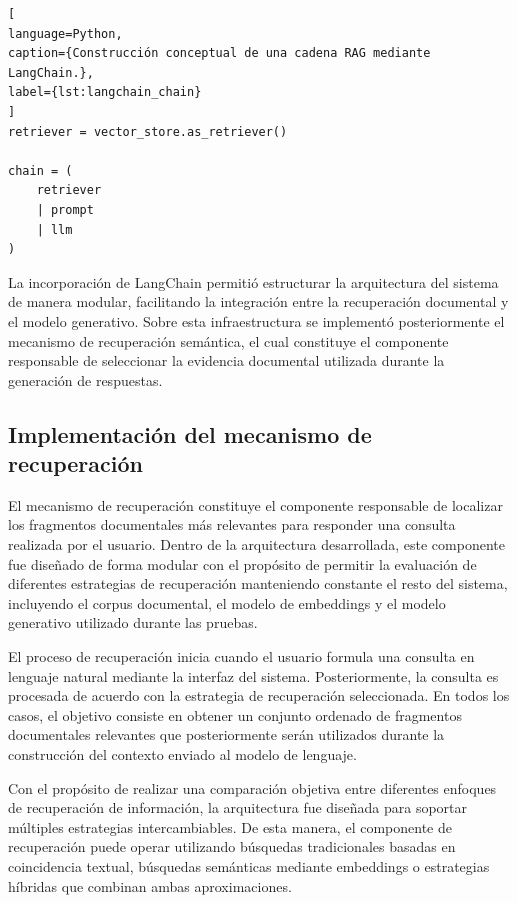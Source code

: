 \begin{lstlisting}[
language=Python,
caption={Construcción conceptual de una cadena RAG mediante LangChain.},
label={lst:langchain_chain}
]
retriever = vector_store.as_retriever()

chain = (
    retriever
    | prompt
    | llm
)
\end{lstlisting}

La incorporación de LangChain permitió estructurar la arquitectura del sistema de manera modular, facilitando la integración entre la recuperación documental y el modelo generativo. Sobre esta infraestructura se implementó posteriormente el mecanismo de recuperación semántica, el cual constituye el componente responsable de seleccionar la evidencia documental utilizada durante la generación de respuestas.

\subsection{Implementación del mecanismo de recuperación}

El mecanismo de recuperación constituye el componente responsable de localizar los fragmentos documentales más relevantes para responder una consulta realizada por el usuario. Dentro de la arquitectura desarrollada, este componente fue diseñado de forma modular con el propósito de permitir la evaluación de diferentes estrategias de recuperación manteniendo constante el resto del sistema, incluyendo el corpus documental, el modelo de embeddings y el modelo generativo utilizado durante las pruebas.

El proceso de recuperación inicia cuando el usuario formula una consulta en lenguaje natural mediante la interfaz del sistema. Posteriormente, la consulta es procesada de acuerdo con la estrategia de recuperación seleccionada. En todos los casos, el objetivo consiste en obtener un conjunto ordenado de fragmentos documentales relevantes que posteriormente serán utilizados durante la construcción del contexto enviado al modelo de lenguaje.

Con el propósito de realizar una comparación objetiva entre diferentes enfoques de recuperación de información, la arquitectura fue diseñada para soportar múltiples estrategias intercambiables. De esta manera, el componente de recuperación puede operar utilizando búsquedas tradicionales basadas en coincidencia textual, búsquedas semánticas mediante embeddings o estrategias híbridas que combinan ambas aproximaciones.

